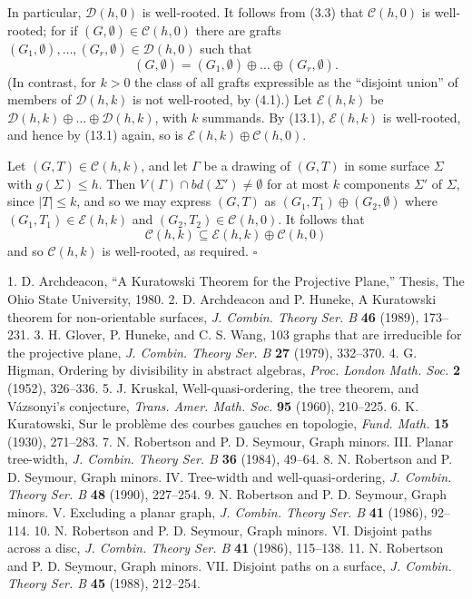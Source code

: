 In particular, $\mathcal{D}(h, 0)$ is well-rooted. It follows from (3.3) that $\mathcal{C}(h, 0)$ is well-rooted; for if $(G, \emptyset) \in \mathcal{C}(h, 0)$ there are grafts $(G_1, \emptyset), \dots, (G_r, \emptyset) \in \mathcal{D}(h, 0)$ such that
\begin{equation*}
(G, \emptyset) = (G_1, \emptyset) \oplus \dots \oplus (G_r, \emptyset).
\end{equation*}
(In contrast, for $k > 0$ the class of all grafts expressible as the ``disjoint union'' of members of $\mathcal{D}(h, k)$ is not well-rooted, by (4.1).) Let $\mathcal{E}(h, k)$ be $\mathcal{D}(h, k) \oplus \dots \oplus \mathcal{D}(h, k)$, with $k$ summands. By (13.1), $\mathcal{E}(h, k)$ is well-rooted, and hence by (13.1) again, so is $\mathcal{E}(h, k) \oplus \mathcal{C}(h, 0)$.

Let $(G, T) \in \mathcal{C}(h, k)$, and let $\Gamma$ be a drawing of $(G, T)$ in some surface $\Sigma$ with $g(\Sigma) \le h$. Then $V(\Gamma) \cap bd(\Sigma') \ne \emptyset$ for at most $k$ components $\Sigma'$ of $\Sigma$, since $|T| \le k$, and so we may express $(G, T)$ as $(G_1, T_1) \oplus (G_2, \emptyset)$ where $(G_1, T_1) \in \mathcal{E}(h, k)$ and $(G_2, T_2) \in \mathcal{C}(h, 0)$. It follows that
\begin{equation*}
\mathcal{C}(h, k) \subseteq \mathcal{E}(h, k) \oplus \mathcal{C}(h, 0)
\end{equation*}
and so $\mathcal{C}(h, k)$ is well-rooted, as required. $\square$


1. D. Archdeacon, ``A Kuratowski Theorem for the Projective Plane,'' Thesis, The Ohio State University, 1980. 2. D. Archdeacon and P. Huneke, A Kuratowski theorem for non-orientable surfaces, \textit{J. Combin. Theory Ser. B} \textbf{46} (1989), 173--231. 3. H. Glover, P. Huneke, and C. S. Wang, 103 graphs that are irreducible for the projective plane, \textit{J. Combin. Theory Ser. B} \textbf{27} (1979), 332--370. 4. G. Higman, Ordering by divisibility in abstract algebras, \textit{Proc. London Math. Soc.} \textbf{2} (1952), 326--336. 5. J. Kruskal, Well-quasi-ordering, the tree theorem, and V\'azsonyi's conjecture, \textit{Trans. Amer. Math. Soc.} \textbf{95} (1960), 210--225. 6. K. Kuratowski, Sur le probl\`eme des courbes gauches en topologie, \textit{Fund. Math.} \textbf{15} (1930), 271--283. 7. N. Robertson and P. D. Seymour, Graph minors. III. Planar tree-width, \textit{J. Combin. Theory Ser. B} \textbf{36} (1984), 49--64. 8. N. Robertson and P. D. Seymour, Graph minors. IV. Tree-width and well-quasi-ordering, \textit{J. Combin. Theory Ser. B} \textbf{48} (1990), 227--254. 9. N. Robertson and P. D. Seymour, Graph minors. V. Excluding a planar graph, \textit{J. Combin. Theory Ser. B} \textbf{41} (1986), 92--114. 10. N. Robertson and P. D. Seymour, Graph minors. VI. Disjoint paths across a disc, \textit{J. Combin. Theory Ser. B} \textbf{41} (1986), 115--138. 11. N. Robertson and P. D. Seymour, Graph minors. VII. Disjoint paths on a surface, \textit{J. Combin. Theory Ser. B} \textbf{45} (1988), 212--254.

